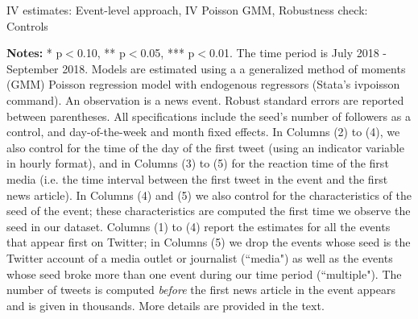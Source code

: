 \clearpage
\pagebreak
\begin{table}
\caption{IV estimates: Event-level approach, IV Poisson GMM, Robustness check: Controls}
\begin{center}
	
\end{center}
\begin{spacing}{0.5}
	{\fns \textbf{Notes:} * p$<$0.10, ** p$<$0.05, *** p$<$0.01. The time period is July 2018 - September 2018. Models are estimated using a a generalized method of moments (GMM) Poisson regression model with endogenous regressors (Stata's ivpoisson command). An observation is a news event. Robust standard errors are reported between parentheses. All specifications include the seed's number of followers as a control, and day-of-the-week and month fixed effects. In Columns (2) to (4), we also control for the time of the day of the first tweet (using an indicator variable in hourly format), and in Columns (3) to (5) for the reaction time of the first media (i.e. the time interval between the first tweet in the event and the first news article). In Columns (4) and (5) we also control for the characteristics of the seed of the event; these characteristics are computed the first time we observe the seed in our dataset. Columns (1) to (4) report the estimates for all the events that appear first on Twitter; in Columns (5) we drop the events whose seed is the Twitter account of a media outlet or journalist (``media") as well as the events whose seed broke more than one event during our time period (``multiple").  The number of tweets is computed \textit{before} the first news article in the event appears and is given in thousands. More details are provided in the text.}
\end{spacing}
\label{Tab:regression_event_IV_Poisson_GMM_RControls}
\end{table} 


